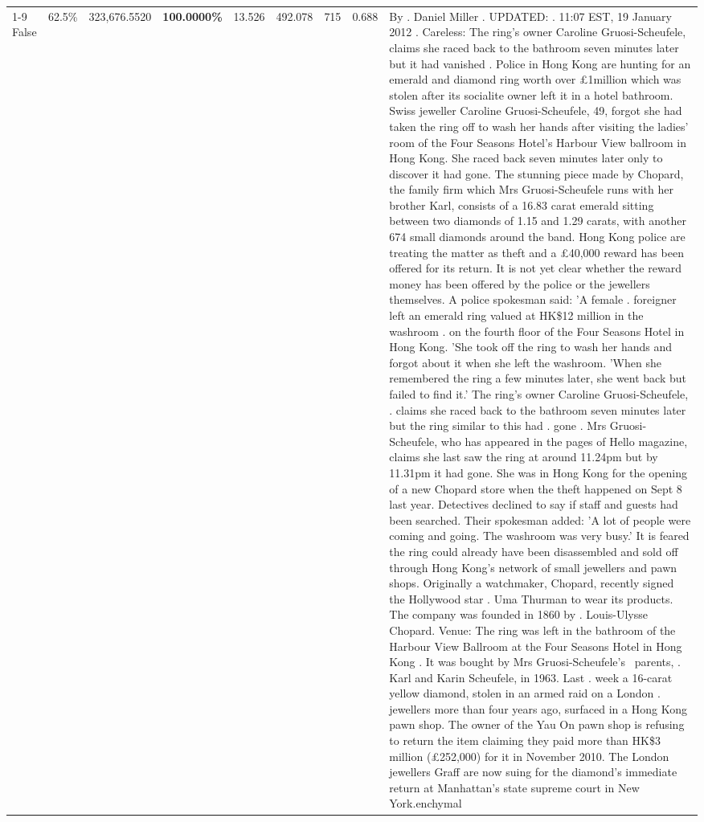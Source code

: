 \begin{table}[H]
\begin{tabular}{lllrlllll}
\cline{1-9}
False & 62.5\% & 323,676.5520 & \bfseries \color{red} 100.0000\% & 13.526 & 492.078 & 715 & 0.688 & By . Daniel Miller . UPDATED: . 11:07 EST, 19 January 2012 . Careless: The ring's owner Caroline Gruosi-Scheufele, claims she raced back to the bathroom seven minutes later but it had vanished . Police in Hong Kong are hunting for an emerald and diamond ring worth over £1million which was stolen after its socialite owner left it in a hotel bathroom. Swiss jeweller Caroline Gruosi-Scheufele, 49, forgot she had taken the ring off to wash her hands after visiting the ladies' room of the Four Seasons Hotel's Harbour View ballroom in Hong Kong. She raced back seven minutes later only to discover it had gone. The stunning piece made by Chopard, the family firm which Mrs Gruosi-Scheufele runs with her brother Karl, consists of a 16.83 carat emerald sitting between two diamonds of 1.15 and 1.29 carats, with another 674 small diamonds around the band. Hong Kong police are treating the matter as theft and a £40,000 reward has been offered for its return. It is not yet clear whether the reward money has been offered by the police or the jewellers themselves. A police spokesman said: 'A female . foreigner left an emerald ring valued at HK\$12 million in the washroom . on the fourth floor of the Four Seasons Hotel in Hong Kong. 'She took off the ring to wash her hands and forgot about it when she left the washroom. 'When she remembered the ring a few minutes later, she went back but failed to find it.' The ring's owner Caroline Gruosi-Scheufele, . claims she raced back to the bathroom seven minutes later but the ring similar to this had . gone . Mrs Gruosi-Scheufele, who has appeared in the pages of Hello magazine, claims she last saw the ring at around 11.24pm but by 11.31pm it had gone. She was in Hong Kong for the opening of a new Chopard store when the theft happened on Sept 8 last year. Detectives declined to say if staff and guests had been searched. Their spokesman added: 'A lot of people were coming and going. The washroom was very busy.' It is feared the ring could already have been disassembled and sold off through Hong Kong's network of small jewellers and pawn shops. Originally a watchmaker, Chopard, recently signed the Hollywood star . Uma Thurman to wear its products. The company was founded in 1860 by . Louis-Ulysse Chopard. Venue: The ring was left in the bathroom of the Harbour View Ballroom at the Four Seasons Hotel in Hong Kong . It was bought by Mrs Gruosi-Scheufele's  parents, . Karl and Karin Scheufele, in 1963. Last . week a 16-carat yellow diamond, stolen in an armed raid on a London . jewellers more than four years ago, surfaced in a Hong Kong pawn shop. The owner of the Yau On pawn shop is refusing to return the item claiming they paid more than HK\$3 million (£252,000) for it in November 2010. The London jewellers Graff are now suing for the diamond’s immediate return at Manhattan’s state supreme court in New York.enchymal \\

\end{tabular}
\end{table}

